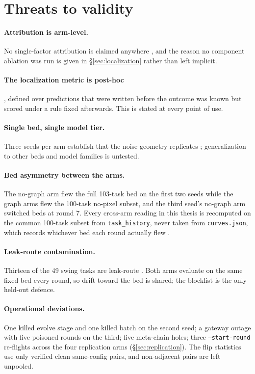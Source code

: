 \section{Threats to validity}
\label{sec:threats}

\paragraph{Attribution is arm-level.} No single-factor attribution is
claimed anywhere , and the reason no component ablation was run is
given in \S\ref{sec:localization} rather than left implicit.

\paragraph{The localization metric is post-hoc}, defined over predictions
that were written before the outcome was known but scored under a rule
fixed afterwards. This is stated at every point of use.

\paragraph{Single bed, single model tier.} Three seeds per arm establish
that the noise geometry replicates ; generalization to other
beds and model families is untested.

\paragraph{Bed asymmetry between the arms.} The no-graph arm flew the full
103-task bed on the first two seeds while the graph arms flew the 100-task
no-pixel subset, and the third seed's no-graph arm switched beds at round 7.
Every cross-arm reading in this thesis is recomputed on the common 100-task
subset from \texttt{task\_history}, never taken from \texttt{curves.json},
which records whichever bed each round actually flew .

\paragraph{Leak-route contamination.} Thirteen of the 49 swing tasks are
leak-route . Both arms evaluate on the same fixed bed every round, so
drift toward the bed is shared; the blocklist is the only held-out defence.

\paragraph{Operational deviations.} One killed evolve stage and one killed
batch on the second seed; a gateway outage with five poisoned rounds on the
third; five meta-chain holes; three \texttt{--start-round} re-flights across
the four replication arms (\S\ref{sec:replication}). The flip statistics use
only verified clean same-config pairs, and non-adjacent pairs are left
unpooled.

